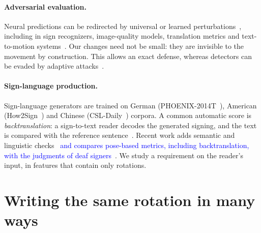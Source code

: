 \documentclass[10pt,twocolumn,letterpaper]{article}
\newcommand{\new}[1]{\textcolor{blue}{#1}}%
\begin{document}
\paragraph{Adversarial evaluation.}
Neural predictions can be redirected by universal or learned perturbations~\cite{uap2017,gap2018,atn2018}, including in sign recognizers, image-quality models, translation metrics and text-to-motion systems~\cite{li2023,liu2024,huang2023,alertmotion2025}. Our changes need not be small: they are invisible to the movement by construction. This allows an exact defense, whereas detectors can be evaded by adaptive attacks~\cite{tramer2020adaptive}.

\paragraph{Sign-language production.}
Sign-language generators are trained on German (PHOENIX-2014T~\cite{camgoz2018}), American (How2Sign~\cite{duarte2021}) and Chinese (CSL-Daily~\cite{zhou2021}) corpora. A common automatic score is \emph{backtranslation}: a sign-to-text reader decodes the generated signing, and the text is compared with the reference sentence~\cite{saunders2020,camgoz2020,walsh2025,low2026}. Recent work adds semantic and linguistic checks~\cite{imai2025,cory2026} \new{and compares pose-based metrics, including backtranslation, with the judgments of deaf signers~\cite{jiang2025}}. We study a requirement on the reader's input, in features that contain only rotations.

\section{Writing the same rotation in many ways}
\end{document}
